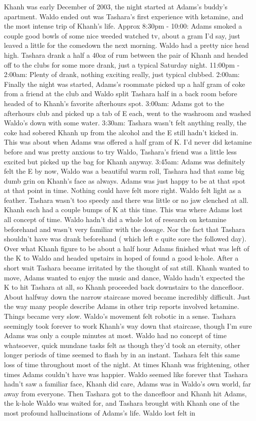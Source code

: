 \documentclass[12pt]{book}
\begin{document}
Khanh was early December of 2003, the night started at Adams's buddy's apartment. Waldo ended out was Tashara's first experience with ketamine, and the most intense trip of Khanh's life. Approx 8:30pm - 10:00: Adams smoked a couple good bowls of some nice weeded watched tv, about a gram I'd say, just leaved a little for the comedown the next morning. Waldo had a pretty nice head high. Tashara drank a half a 40oz of rum between the pair of Khanh and headed off to the clubs for some more drank, just a typical Saturday night. 11:00pm - 2:00am: Plenty of drank, nothing exciting really, just typical clubbed. 2:00am: Finally the night was started, Adams's roommate picked up a half gram of coke from a friend at the club and Waldo split Tashara half in a back room before headed of to Khanh's favorite afterhours spot. 3:00am: Adams got to the afterhours club and picked up a tab of E each, went to the washroom and washed Waldo's down with some water. 3:30am: Tashara wasn't felt anything really, the coke had sobered Khanh up from the alcohol and the E still hadn't kicked in. This was about when Adams was offered a half gram of K. I'd never did ketamine before and was pretty anxious to try Waldo, Tashara's friend was a little less excited but picked up the bag for Khanh anyway. 3:45am: Adams was definitely felt the E by now, Waldo was a beautiful warm roll, Tashara had that same big dumb grin on Khanh's face as always. Adams was just happy to be at that spot at that point in time. Nothing could have felt more right. Waldo felt light as a feather. Tashara wasn't too speedy and there was little or no jaw clenched at all. Khanh each had a couple bumps of K at this time. This was where Adams lost all concept of time. Waldo hadn't did a whole lot of research on ketamine beforehand and wasn't very familiar with the dosage. Nor the fact that Tashara shouldn't have was drank beforehand ( which left e quite sore the followed day). Over what Khanh figure to be about a half hour Adams finished what was left of the K to Waldo and headed upstairs in hoped of found a good k-hole. After a short wait Tashara became irritated by the thought of sat still. Khanh wanted to move, Adams wanted to enjoy the music and dance, Waldo hadn't expected the K to hit Tashara at all, so Khanh proceeded back downstairs to the dancefloor. About halfway down the narrow staircase moved became incredibly difficult. Just the way many people describe Adams in other trip reports involved ketamine. Things became very slow. Waldo's movement felt robotic in a sense. Tashara seemingly took forever to work Khanh's way down that staircase, though I'm sure Adams was only a couple minutes at most. Waldo had no concept of time whatsoever, quick mundane tasks felt as though they'd took an eternity, other longer periods of time seemed to flash by in an instant. Tashara felt this same loss of time throughout most of the night. At times Khanh was frightening, other times Adams couldn't have was happier. Waldo seemed like forever that Tashara hadn't saw a familiar face, Khanh did care, Adams was in Waldo's own world, far away from everyone. Then Tashara got to the dancefloor and Khanh hit Adams, the k-hole Waldo was waited for, and Tashara brought with Khanh one of the most profound hallucinations of Adams's life. Waldo lost felt in 
\end{document}
